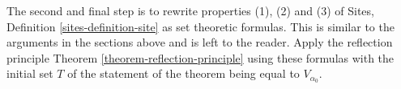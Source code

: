 \medskip\noindent
The second and final step is to rewrite properties (1), (2) and (3) of
Sites, Definition \ref{sites-definition-site} as set theoretic formulas.
This is similar to the arguments in the sections above and is
left to the reader. Apply the reflection
principle Theorem \ref{theorem-reflection-principle} using these formulas
with the initial set $T$ of the statement of the theorem being equal to
$V_{\alpha_0}$.








